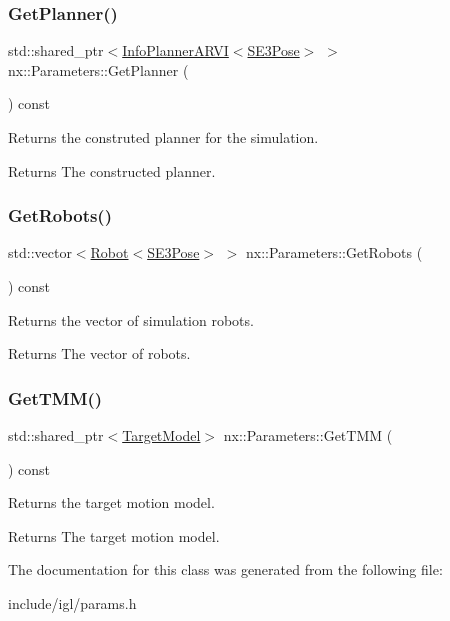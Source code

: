 \subsubsection{\texorpdfstring{Get\+Planner()}{GetPlanner()}}
{\footnotesize\ttfamily std\+::shared\+\_\+ptr$<$\hyperlink{classnx_1_1InfoPlannerARVI}{Info\+Planner\+A\+R\+VI}$<$\hyperlink{structnx_1_1SE3Pose}{S\+E3\+Pose}$>$ $>$ nx\+::\+Parameters\+::\+Get\+Planner (\begin{DoxyParamCaption}{ }\end{DoxyParamCaption}) const\hspace{0.3cm}{\ttfamily [inline]}}

Returns the construted planner for the simulation. \begin{DoxyReturn}{Returns}
The constructed planner. 
\end{DoxyReturn}
\mbox{\label{classnx_1_1Parameters_ac58789b10f6377ae6e0b55c98015c147}} 
\subsubsection{\texorpdfstring{Get\+Robots()}{GetRobots()}}
{\footnotesize\ttfamily std\+::vector$<$\hyperlink{classnx_1_1Robot}{Robot}$<$\hyperlink{structnx_1_1SE3Pose}{S\+E3\+Pose}$>$ $>$ nx\+::\+Parameters\+::\+Get\+Robots (\begin{DoxyParamCaption}{ }\end{DoxyParamCaption}) const\hspace{0.3cm}{\ttfamily [inline]}}

Returns the vector of simulation robots. \begin{DoxyReturn}{Returns}
The vector of robots. 
\end{DoxyReturn}
\mbox{\label{classnx_1_1Parameters_a68fdc4f85de0a03a9ba56bdd99da45c7}} 
\subsubsection{\texorpdfstring{Get\+T\+M\+M()}{GetTMM()}}
{\footnotesize\ttfamily std\+::shared\+\_\+ptr$<$\hyperlink{classnx_1_1TargetModel}{Target\+Model}$>$ nx\+::\+Parameters\+::\+Get\+T\+MM (\begin{DoxyParamCaption}{ }\end{DoxyParamCaption}) const\hspace{0.3cm}{\ttfamily [inline]}}

Returns the target motion model. \begin{DoxyReturn}{Returns}
The target motion model. 
\end{DoxyReturn}


The documentation for this class was generated from the following file\+:\begin{DoxyCompactItemize}
\item 
include/igl/params.\+h\end{DoxyCompactItemize}
